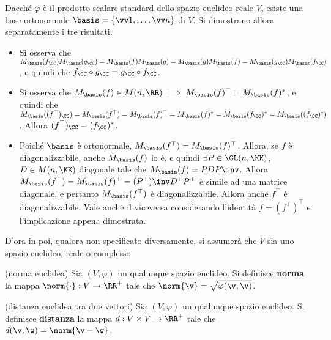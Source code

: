 \begin{solution}
	Dacché $\varphi$ è il prodotto scalare standard dello spazio euclideo reale $V$, esiste una base ortonormale $\basis = \{ \vv 1, \ldots, \vv n\}$ di $V$. Si dimostrano allora separatamente i tre risultati.
	
	\begin{itemize}
		\item Si osserva che $M_\basis(f_\CC) M_\basis(g_\CC) = M_\basis(f) M_\basis(g) =
		M_\basis(g) M_\basis(f) = M_\basis(g_\CC) M_\basis(f_\CC)$, e quindi
		che $f_\CC \circ g_\CC = g_\CC \circ f_\CC$.
		
		\item Si osserva che $M_\basis(f) \in M(n, \RR) \implies M_\basis(f)^\top = M_\basis(f)^*$, e quindi che $M_\basis((f^\top)_\CC) = M_\basis(f^\top) = M_\basis(f)^\top = M_\basis(f)^* = M_\basis(f_\CC)^* = M_\basis((f_\CC)^*)$. Allora
		$(f^\top)_\CC= (f_\CC)^*$.
		
		\item Poiché $\basis$ è ortonormale, $M_\basis(f^\top) = M_\basis(f)^\top$. Allora, se
		$f$ è diagonalizzabile, anche $M_\basis(f)$ lo è, e quindi $\exists P \in \GL(n, \KK)$,
		$D \in M(n, \KK)$ diagonale tale che $M_\basis(f) = P D P\inv$. Allora $M_\basis(f^\top) =
		M_\basis(f)^\top = (P^\top)\inv D^\top P^\top$ è simile ad una matrice diagonale, e
		pertanto $M_\basis(f^\top)$ è diagonalizzabile. Allora anche $f^\top$ è diagonalizzabile.
		Vale anche il viceversa considerando l'identità $f = (f^\top)^\top$ e l'implicazione
		appena dimostrata.
	\end{itemize}
\end{solution}

\hr

\begin{note}
	D'ora in poi, qualora non specificato diversamente, si assumerà che $V$ sia uno spazio
	euclideo, reale o complesso.
\end{note}

\begin{definition} (norma euclidea)
	Sia $(V, \varphi)$ un qualunque spazio euclideo. Si definisce \textbf{norma} la mappa
	$\norm{\cdot} : V \to \RR^+$ tale che $\norm{\v} = \sqrt{\varphi(\v, \v)}$.
\end{definition}

\begin{definition} (distanza euclidea tra due vettori)
	Sia $(V, \varphi)$ un qualunque spazio euclideo. Si definisce \textbf{distanza} la mappa
	$d : V \times V \to \RR^+$ tale che $d(\v, \w) = \norm{\v - \w}$.
\end{definition}

